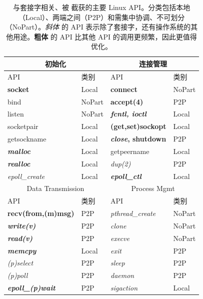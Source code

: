 \begin{table}[htbp]
	\centering
	\small
	\begin{tabular}{ll|ll}
		\toprule
		\multicolumn{2}{c|}{初始化} &
		\multicolumn{2}{c}{连接管理} \\
		\midrule
		API & 类别 &
		API & 类别 \\
		\midrule
		\textbf{socket} & Local &
		\textbf{connect} & NoPart \\

		bind & NoPart &
		\textbf{accept(4)} & P2P \\

		listen & NoPart &
		\textbf{\textit{fcntl, ioctl}} & Local \\

		socketpair & Local &
		\textbf{(get,set)sockopt} & Local \\

		getsockname  & Local &
		\textbf{\textit{close}, shutdown} & P2P \\

		\textbf{\textit{malloc}} & Local &
		getpeername & Local \\

		\textbf{\textit{realloc}} & Local &
		\textit{dup(2)} & P2P  \\

		\textit{epoll\_create} & Local &
		\textbf{\textit{epoll\_ctl}} & Local \\
		\bottomrule
		\toprule
		\multicolumn{2}{c|}{Data Transmission} &
		\multicolumn{2}{c}{Process Mgmt} \\
		\midrule
		API & 类别 &
		API & 类别 \\
		\midrule
		\textbf{recv(from,(m)msg)} & P2P &
		\textit{pthread\_create} & NoPart \\

		\textbf{\textit{write(v)}} & P2P &
		\textit{clone} & NoPart \\

		\textbf{\textit{read(v)}} & P2P &
		\textit{execve} & NoPart \\

		\textbf{\textit{memcpy}} & Local &
		\textit{exit} & P2P \\

		\textit{(p)select} & P2P &
		\textit{sleep} & P2P \\

		\textit{(p)poll} & P2P &
		\textit{daemon} & P2P \\

		\textbf{\textit{epoll\_(p)wait}} & P2P &
		\textit{sigaction} & Local \\
		\bottomrule
	\end{tabular}
	\caption{与套接字相关、被 \libipc{} 截获的主要 Linux API。分类包括本地（Local）、两端之间（P2P）和需集中协调、不可划分（NoPart）。\textit{斜体} 的 API 表示除了套接字，还有操作系统的其他用途。\textbf{粗体} 的 API 比其他 API 的调用更频繁，因此更值得优化。}
	\label{socksdirect:tab:socket-api}
\end{table}



